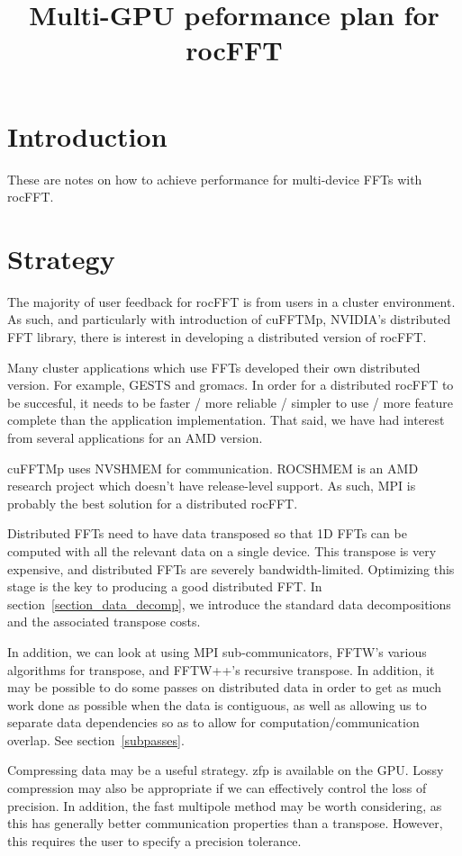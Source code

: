 \documentclass[12pt]{article}
\title{Multi-GPU peformance plan for rocFFT}
\author{}
\renewcommand{\(}{\left(}
\renewcommand{\)}{\right)}
\begin{document}
\maketitle

\section{Introduction}

These are notes on how to achieve performance for multi-device FFTs with
rocFFT.

\section{Strategy}

The majority of user feedback for rocFFT is from users in a cluster
environment.  As such, and particularly with introduction of cuFFTMp,
NVIDIA's distributed FFT library, there is interest in developing a
distributed version of rocFFT.

Many cluster applications which use FFTs developed their own
distributed version.  For example, GESTS and gromacs.  In order for a
distributed rocFFT to be succesful, it needs to be faster / more
reliable / simpler to use / more feature complete than the application
implementation.  That said, we have had interest from several
applications for an AMD version.

cuFFTMp uses NVSHMEM for communication.  ROCSHMEM is an AMD research
project which doesn't have release-level support.  As such, MPI is
probably the best solution for a distributed rocFFT.

Distributed FFTs need to have data transposed so that 1D FFTs can be
computed with all the relevant data on a single device.  This
transpose is very expensive, and distributed FFTs are severely
bandwidth-limited.  Optimizing this stage is the key to producing a
good distributed FFT.  In section~\ref{section_data_decomp}, we
introduce the standard data decompositions and the associated
transpose costs.

In addition, we can look at using MPI sub-communicators, FFTW's
various algorithms for transpose, and FFTW++'s recursive transpose.
In addition, it may be possible to do some passes on distributed data
in order to get as much work done as possible when the data is
contiguous, as well as allowing us to separate data dependencies so as
to allow for computation/communication overlap.  See
section~\ref{subpasses}.

Compressing data may be a useful strategy.  zfp is available on the
GPU.  Lossy compression may also be appropriate if we can effectively
control the loss of precision.  In addition, the fast multipole method
may be worth considering, as this has generally better communication
properties than a transpose.  However, this requires the user to
specify a precision tolerance.
\end{document}
